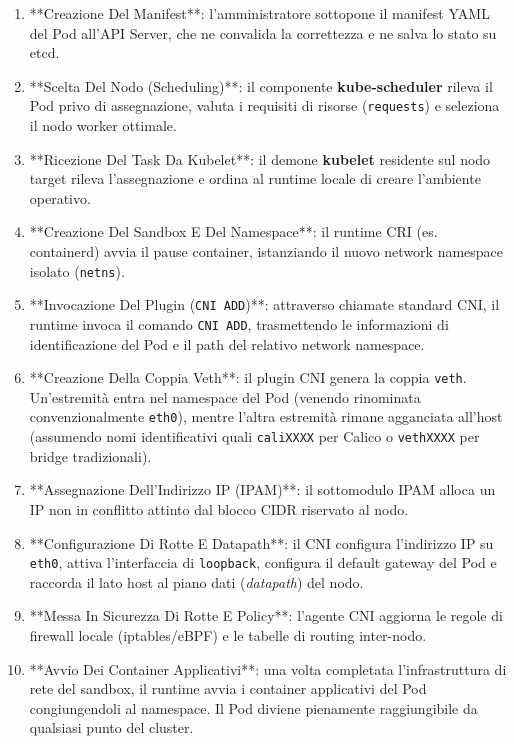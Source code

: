 \documentclass[11pt, a4paper]{article}
\begin{document}
\begin{enumerate}
    \item **Creazione Del Manifest**: l'amministratore sottopone il manifest YAML del Pod all'API Server, che ne convalida la correttezza e ne salva lo stato su etcd.
    \item **Scelta Del Nodo (Scheduling)**: il componente \textbf{kube-scheduler} rileva il Pod privo di assegnazione, valuta i requisiti di risorse (\texttt{requests}) e seleziona il nodo worker ottimale.
    \item **Ricezione Del Task Da Kubelet**: il demone \textbf{kubelet} residente sul nodo target rileva l'assegnazione e ordina al runtime locale di creare l'ambiente operativo.
    \item **Creazione Del Sandbox E Del Namespace**: il runtime CRI (es. containerd) avvia il pause container, istanziando il nuovo network namespace isolato (\texttt{netns}).
    \item **Invocazione Del Plugin (\texttt{CNI ADD})**: attraverso chiamate standard CNI, il runtime invoca il comando \texttt{CNI ADD}, trasmettendo le informazioni di identificazione del Pod e il path del relativo network namespace.
    \item **Creazione Della Coppia Veth**: il plugin CNI genera la coppia \texttt{veth}. Un'estremità entra nel namespace del Pod (venendo rinominata convenzionalmente \texttt{eth0}), mentre l'altra estremità rimane agganciata all'host (assumendo nomi identificativi quali \texttt{caliXXXX} per Calico o \texttt{vethXXXX} per bridge tradizionali).
    \item **Assegnazione Dell'Indirizzo IP (IPAM)**: il sottomodulo IPAM alloca un IP non in conflitto attinto dal blocco CIDR riservato al nodo.
    \item **Configurazione Di Rotte E Datapath**: il CNI configura l'indirizzo IP su \texttt{eth0}, attiva l'interfaccia di \texttt{loopback}, configura il default gateway del Pod e raccorda il lato host al piano dati (\emph{datapath}) del nodo.
    \item **Messa In Sicurezza Di Rotte E Policy**: l'agente CNI aggiorna le regole di firewall locale (iptables/eBPF) e le tabelle di routing inter-nodo.
    \item **Avvio Dei Container Applicativi**: una volta completata l'infrastruttura di rete del sandbox, il runtime avvia i container applicativi del Pod congiungendoli al namespace. Il Pod diviene pienamente raggiungibile da qualsiasi punto del cluster.
\end{enumerate}
\end{document}
